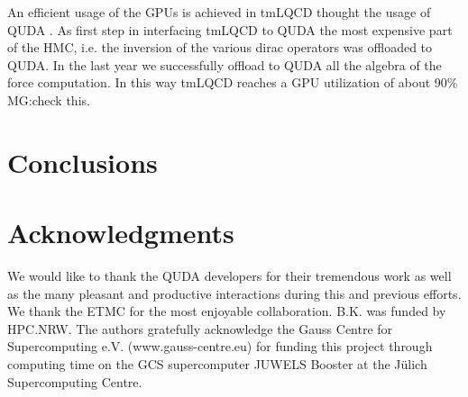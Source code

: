 \documentclass[a0,portrait]{a0poster}
\begin{document}
\begin{multicols}{2}
    An efficient usage of the GPUs is achieved in tmLQCD thought the usage of QUDA
    \cite{Clark:2009wm,Babich:2011np}. As first step in interfacing tmLQCD to QUDA \cite{Kostrzewa:2022hsv} the most expensive part of the HMC, i.e. the inversion of the various dirac operators was offloaded to QUDA.  In the last year we successfully offload to QUDA all the algebra of the force computation. In this way tmLQCD reaches a GPU utilization of about {90\% \color{red} MG:check this}.


    \color{SaddleBrown} %

    \section*{Conclusions}
    \color{Black} %


    \section*{Acknowledgments}

    We would like to thank the QUDA developers for their tremendous work as well as the many pleasant and productive
    interactions during this and previous efforts. We thank the ETMC for the most enjoyable collaboration. B.K. was funded
    by HPC.NRW.
    The authors gratefully acknowledge the Gauss Centre for Supercomputing e.V.
    (www.gauss-centre.eu) for funding this project through computing time on the GCS supercomputer JUWELS Booster
    at the Jülich Supercomputing Centre.


\end{multicols}
\end{document}
